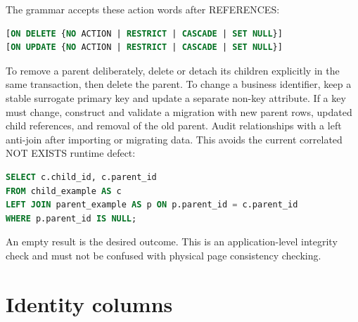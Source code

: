 The grammar accepts these action words after REFERENCES:

\begin{lstlisting}[language=SQL]
[ON DELETE {NO ACTION | RESTRICT | CASCADE | SET NULL}]
[ON UPDATE {NO ACTION | RESTRICT | CASCADE | SET NULL}]
\end{lstlisting}


To remove a parent deliberately, delete or detach its children explicitly in the same transaction, then delete the parent. To change a business identifier, keep a stable surrogate primary key and update a separate non-key attribute. If a key must change, construct and validate a migration with new parent rows, updated child references, and removal of the old parent. Audit relationships with a left anti-join after importing or migrating data. This avoids the current correlated NOT EXISTS runtime defect:

\begin{lstlisting}[language=SQL]
SELECT c.child_id, c.parent_id
FROM child_example AS c
LEFT JOIN parent_example AS p ON p.parent_id = c.parent_id
WHERE p.parent_id IS NULL;
\end{lstlisting}

An empty result is the desired outcome. This is an application-level integrity check and must not be confused with physical page consistency checking.


\section{Identity columns}
\label{sql:identity}

